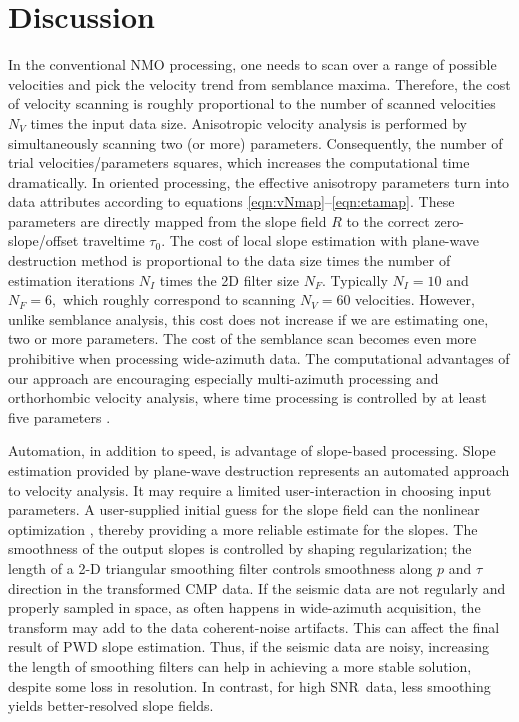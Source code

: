 \section{Discussion}

In the conventional NMO processing, one needs to scan over a range of
possible velocities and pick the  velocity trend from
semblance maxima. Therefore, the cost of velocity scanning is roughly
proportional to the number of scanned velocities $N_{V}$ times the
input data size.  Anisotropic velocity analysis is performed by
simultaneously scanning two (or more) parameters. Consequently, the
number of trial velocities/parameters squares, which increases the
computational time dramatically. In oriented processing, the effective
anisotropy parameters turn into data attributes according to equations
\ref{eqn:vNmap}--\ref{eqn:etamap}. These parameters are directly
mapped from the slope field $R$ to the correct zero-slope/offset
traveltime $\tau_0$. The cost of local slope estimation with
plane-wave destruction method is proportional to the data size times
the number of estimation iterations $N_{I}$ times the 2D filter size
$N_{F}$. Typically $N_{I}=10$ and $N_{F}=6,$ which roughly correspond
to scanning $N_{V}=60$ velocities. However, unlike semblance analysis,
this cost does not increase if we are estimating one, two or more
parameters. The cost of the semblance scan becomes even more
prohibitive when processing wide-azimuth data. The computational
advantages of our approach are  encouraging especially
  multi-azimuth processing and
orthorhombic velocity analysis, where time processing is controlled by
at least five parameters \citep{ilyabook2006}.

Automation, in addition to speed, is   advantage of  slope-based processing.  Slope
estimation provided by plane-wave destruction represents an automated
approach to velocity analysis. It may require a limited
user-interaction in choosing input parameters. A user-supplied initial
guess for the slope field can   the
nonlinear optimization , thereby providing a more
reliable estimate for the slopes. The smoothness of the output slopes
is controlled by shaping regularization; the length of a 2-D
triangular smoothing filter controls smoothness along $p$ and $\tau $
direction in the \taup transformed CMP data. If the 
seismic data are not regularly and properly sampled in space, as often
happens in wide-azimuth acquisition, the \taup transform may add to
the data coherent-noise artifacts. This can affect the final result of
PWD slope estimation. Thus, if the seismic \taup data are 
noisy, increasing the length of smoothing filters can help in
achieving a more stable solution, despite some loss in resolution. In
contrast, for high SNR\ data, less smoothing yields better-resolved
slope fields.

